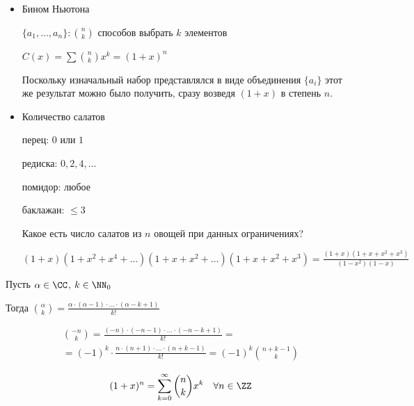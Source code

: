 \begin{example}{}{}
    \begin{itemize}
        \item
            Бином Ньютона

            \( \{ a_1, \ldots, a_n \} : \binom{n}{k} \) способов выбрать \( k \) элементов

            \( C(x) = \sum\limits \binom{n}{k} x^k = (1 + x)^n \)

            Поскольку изначальный набор представлялся в виде объединения \( \{ a_i \} \)
            этот же результат можно было получить, сразу возведя \( (1 + x) \) в степень \( n \).
        \item
            Количество салатов

            перец: \( 0 \) или \( 1 \)

            редиска: \( 0, 2, 4, \ldots \)

            помидор: любое

            баклажан: \( \leq 3 \)

            Какое есть число салатов из \( n \) овощей при данных ограничениях?

            \( (1 + x)(1 + x^2 + x^4 + \ldots)(1 + x + x^2 + \ldots)(1 + x + x^2 + x^3) = \frac{(1 + x)(1 + x + x^2 + x^3)}{(1 - x^2)(1 - x)} \)
    \end{itemize}
\end{example}

\begin{defn}{}{}
    Пусть \( \alpha \in \CC \), \( k \in \NN_0 \)

    Тогда \( \binom{\alpha}{k} = \frac{\alpha \cdot (\alpha - 1) \cdot \ldots \cdot (\alpha - k + 1)}{k!} \)
\end{defn}

\begin{remark}{}{}
    \begin{gather*}
        \binom{-n}{k}
        =
        \frac{(-n) \cdot (-n - 1) \cdot \ldots \cdot (-n - k + 1)}{k!}
        =
        \\
        =
        (-1)^k \cdot \frac{n \cdot (n + 1) \cdot \ldots \cdot (n + k - 1)}{k!}
        =
        (-1)^k \binom{n + k - 1}{k}
    \end{gather*}
\end{remark}

\begin{thrm}{}{}
    \[
        (1 + x)^n = \sum\limits_{k = 0}^{\infty} \binom{n}{k} x^k \quad \forall n \in \ZZ
    \]
\end{thrm}

